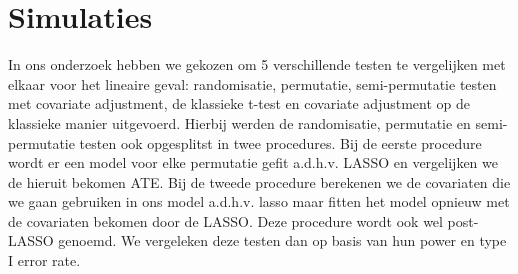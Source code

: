 \documentclass[12pt, a4paper, faculty=we]{ugent-doc}
\begin{document}
\begin{flushleft}
\end{flushleft}




\section{Simulaties}
\begin{flushleft}
    In ons onderzoek hebben we gekozen om 5 verschillende testen te vergelijken met elkaar voor het lineaire geval: randomisatie, permutatie, semi-permutatie testen met covariate adjustment, de klassieke t-test en covariate adjustment op de klassieke manier uitgevoerd.
    Hierbij werden de randomisatie, permutatie en semi-permutatie testen ook opgesplitst in twee procedures. Bij de eerste procedure wordt er een model voor elke permutatie gefit a.d.h.v. LASSO en vergelijken we de hieruit bekomen ATE. Bij de tweede procedure berekenen
    we de covariaten die we gaan gebruiken in ons model a.d.h.v. lasso maar fitten het model opnieuw met de covariaten bekomen door de LASSO. Deze procedure wordt ook wel post-LASSO genoemd.
     We vergeleken deze testen dan op basis van hun power en type I error rate.
\end{flushleft}



\nocite{*}
\printbibliography[heading=bibintoc, title={Bibliografie}]
\end{document}
